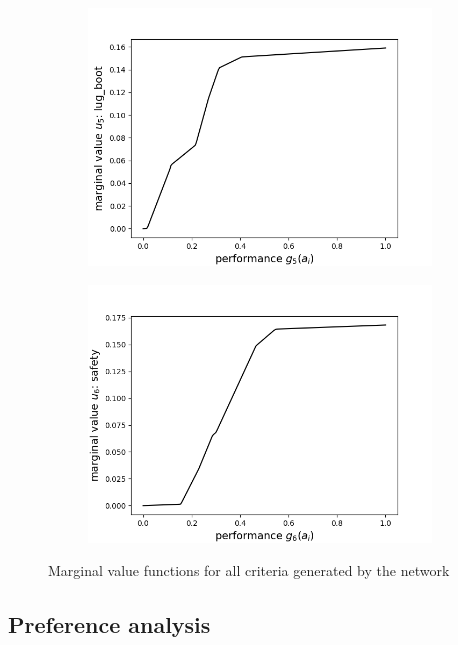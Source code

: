 \documentclass[../main.tex]{subfiles}
\begin{document}
\begin{figure}[H]
    \begin{subfigure}[b]{0.48\linewidth}
        \includegraphics[width=\linewidth]{../img/marginal4.png}
    \end{subfigure}
    \begin{subfigure}[b]{0.48\linewidth}
        \includegraphics[width=\linewidth]{../img/marginal5.png}
    \end{subfigure}
    \caption{Marginal value functions for all criteria generated by the network}
\end{figure}



\subsection{Preference analysis}
\end{document}
